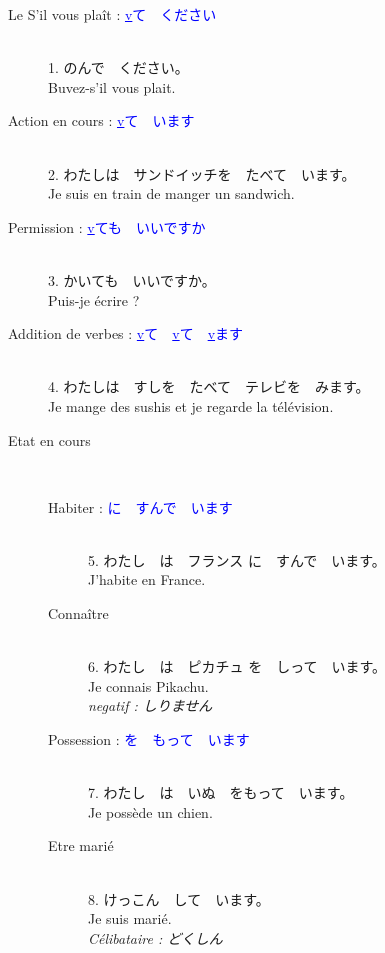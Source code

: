 \documentclass[11pt]{report}
\newenvironment{Japanese}{%
\CJKfamily{min}%
\CJKtilde  
\CJKnospace}{}
\begin{document}
\begin{CJK}{UTF8}{}  
\begin{Japanese}
	\begin{description}
		\item[Le S'il vous plaît : \textcolor{blue}{\underline{v}て　ください}] \hfill \\
			1. のんで　ください。 \\
			Buvez-s'il vous plait.
		\item[Action en cours : \textcolor{blue}{\underline{v}て　います}] \hfill \\
			2. わたしは　サンドイッチを　たべて　います。 \\
			Je suis en train de manger un sandwich.
		\item[Permission : \textcolor{blue}{\underline{v}ても　いいですか}] \hfill \\
			3. かいても　いいですか。 \\
			Puis-je écrire ?
		\item[Addition de verbes : \textcolor{blue}{\underline{v}て　\underline{v}て　\underline{v}ます}] \hfill \\
			4. わたしは　すしを　たべて　テレビを　みます。 \\
			Je mange des sushis et je regarde la télévision.  \\
			\item[Etat en cours] \hfill \\
			\begin{description}
				\item[Habiter : \textcolor{blue}{\underline{\qquad} に　すんで　います}] \hfill \\
				5. わたし　は　フランス に　すんで　います。 \\
				J'habite en France.
				\item[Connaître] \hfill \\
				6. わたし　は　ピカチュ を　しって　います。 \\
				Je connais Pikachu. \\
				\emph{negatif : しりません}
				\item[Possession : \textcolor{blue}{\underline{\qquad}を　もって　います}] \hfill \\
				7. わたし　は　いぬ　をもって　います。 \\
				Je possède un chien.
				\item[Etre mari\'e] \hfill \\
				8. けっこん　して　います。 \\
				Je suis marié. \\
				\emph{Célibataire : どくしん}
			\end{description}
	\end{description}
\end{Japanese}  
\end{CJK}
\end{document}
